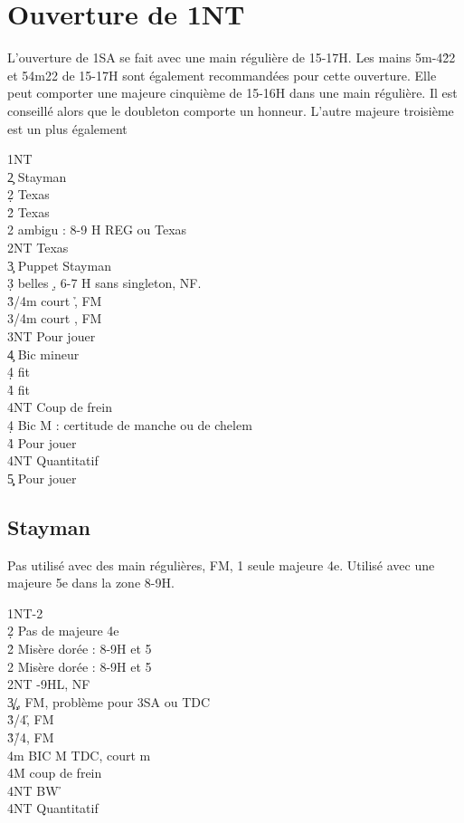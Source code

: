 \documentclass[a4paper]{article}
\begin{document}
\section{Ouverture de 1NT}

L’ouverture de 1SA se fait avec une main régulière de 15-17H. 
Les mains 5m-4\h 22 et 54m22 de 15-17H sont également recommandées pour cette 
ouverture.
Elle peut comporter une majeure cinquième de 15-16H dans une main régulière. Il est 
conseillé alors que le doubleton comporte un honneur. L’autre majeure troisième est un plus 
également

\begin{bidtable}
1NT\+\\
2\c \> Stayman\\
2\d \> Texas \h \\
2\h \> Texas \s \\
2\s \> ambigu : 8-9 H REG ou Texas \c \\
2NT \> Texas \d \\
3\c \> Puppet Stayman\\
3\d {} belles \d , 6-7 H sans singleton, NF.\\
3\h {}/4m court \h , FM\\
3\s {}/4m court \s , FM\\
3NT \> Pour jouer\\
4\c \> Bic mineur\+\\
4\d \> fit \d \\
4\h\s \> fit \c \\
4NT \> Coup de frein\-\\
4\d \> Bic M : certitude de manche ou de chelem\\
4\h\s \> Pour jouer\\
4NT \> Quantitatif\\
5\c\d \> Pour jouer\-
\end{bidtable}

\subsection{Stayman}

Pas utilisé avec des main régulières, FM, 1 seule majeure 4e.
Utilisé avec une majeure 5e dans la zone 8-9H.

\begin{bidtable}
1NT-2\c\\
2\d \> Pas de majeure 4e\+\\
2\h \> Misère dorée : 8-9H et 5\h \\
2\s \> Misère dorée : 8-9H et 5\s \\
2NT -9HL, NF\\
3\c\d {}\c /\d , FM, problème pour 3SA ou TDC\\
3\h {}\s /4\h , FM\\
3\h {}\h /4\s , FM\\
4m \> BIC M TDC, court m\+\\
4M \> coup de frein\\
4NT \> BW \h \-\\
4NT \> Quantitatif\-
\end{bidtable}
\end{document}
